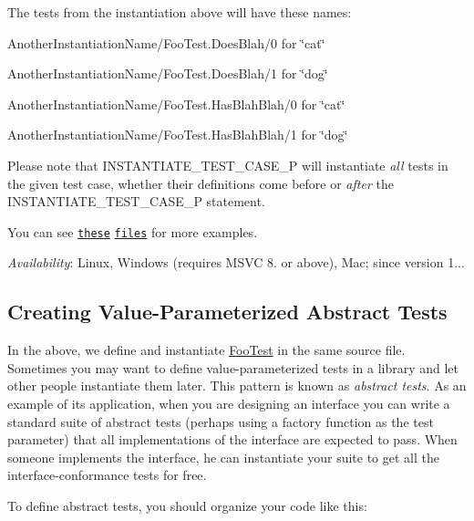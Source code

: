 The tests from the instantiation above will have these names\+:


\begin{DoxyItemize}
\item {\ttfamily Another\+Instantiation\+Name/\+Foo\+Test.\+Does\+Blah/0} for {\ttfamily \char`\"{}cat\char`\"{}}
\item {\ttfamily Another\+Instantiation\+Name/\+Foo\+Test.\+Does\+Blah/1} for {\ttfamily \char`\"{}dog\char`\"{}}
\item {\ttfamily Another\+Instantiation\+Name/\+Foo\+Test.\+Has\+Blah\+Blah/0} for {\ttfamily \char`\"{}cat\char`\"{}}
\item {\ttfamily Another\+Instantiation\+Name/\+Foo\+Test.\+Has\+Blah\+Blah/1} for {\ttfamily \char`\"{}dog\char`\"{}}
\end{DoxyItemize}

Please note that {\ttfamily I\+N\+S\+T\+A\+N\+T\+I\+A\+T\+E\+\_\+\+T\+E\+S\+T\+\_\+\+C\+A\+S\+E\+\_\+P} will instantiate {\itshape all} tests in the given test case, whether their definitions come before or {\itshape after} the {\ttfamily I\+N\+S\+T\+A\+N\+T\+I\+A\+T\+E\+\_\+\+T\+E\+S\+T\+\_\+\+C\+A\+S\+E\+\_\+P} statement.

You can see \href{../samples/sample7_unittest.cc}{\tt these} \href{../samples/sample8_unittest.cc}{\tt files} for more examples.

{\itshape Availability}\+: Linux, Windows (requires M\+S\+VC 8. or above), Mac; since version 1...

\subsection*{Creating Value-\/\+Parameterized Abstract Tests}

In the above, we define and instantiate {\ttfamily \hyperlink{class_foo_test}{Foo\+Test}} in the same source file. Sometimes you may want to define value-\/parameterized tests in a library and let other people instantiate them later. This pattern is known as {\itshape abstract tests}. As an example of its application, when you are designing an interface you can write a standard suite of abstract tests (perhaps using a factory function as the test parameter) that all implementations of the interface are expected to pass. When someone implements the interface, he can instantiate your suite to get all the interface-\/conformance tests for free.

To define abstract tests, you should organize your code like this\+:


